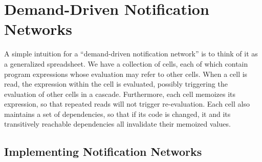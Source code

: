 \section{Demand-Driven Notification Networks}

A simple intuition for a ``demand-driven notification network'' is to
think of it as a generalized spreadsheet. We have a collection of
cells, each of which contain program expressions whose evaluation may
refer to other cells. When a cell is read, the expression within the
cell is evaluated, possibly triggering the evaluation of other cells
in a cascade. Furthermore, each cell memoizes its expression, so that
repeated reads will not trigger re-evaluation. Each cell also maintains a
set of dependencies, so that if its code is changed, it and its
transitively reachable dependencies all invalidate their memoized
values.

\subsection{Implementing Notification Networks}

